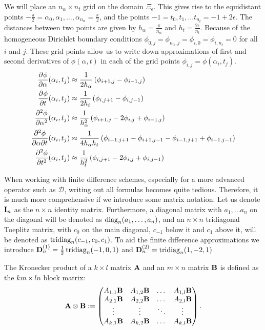 We will place an $n_\alpha \times n_t$ grid on the domain $\Xi_\epsilon$. This gives rise to the equidistant points $-\frac{\pi}{2}=\alpha_0, \alpha_1, \dots, \alpha_{n_\alpha} = \frac{\pi}{2}$, and the points $-1 = t_0, t_1, \dots t_{n_t} = -1 + 2\epsilon$. The distances between two points are given by $h_\alpha = \frac{\pi}{n_\alpha}$ and $h_t = \frac{2\epsilon}{n_t}$. Because of the homogeneous Dirichlet boundary conditions $\phi_{0,j} = \phi_{n_\alpha,j} = \phi_{i, 0} = \phi_{i,n_t} = 0$ for all $i$ and $j$. These grid points allow us to write down approximations of first and second derivatives of $\phi(\alpha, t)$ in each of the grid points $\phi_{i, j} = \phi(\alpha_i, t_j)$.
\begin{align*}
  {\pdv[]{\phi}{\alpha}}(\alpha_i, t_j)    & \approx \frac{1}{2h_\alpha}\left( \phi_{i+1,j} - \phi_{i-1,j} \right)                                           \\
  {\pdv[]{\phi}{t}}(\alpha_i, t_j)         & \approx \frac{1}{2h_t}\left( \phi_{i,j+1} - \phi_{i,j-1} \right)                                                \\
  {\pdv[2]{\phi}{\alpha}}(\alpha_i, t_j)   & \approx \frac{1}{h_\alpha^2}\left( \phi_{i+1,j} - 2 \phi_{i,j} + \phi_{i-1,j} \right)                           \\
  {\pdv[]{\phi}{\alpha}{t}}(\alpha_i, t_j) & \approx \frac{1}{4h_\alpha h_t}\left( \phi_{i+1,j+1} - \phi_{i+1,j-1} - \phi_{i-1,j+1} + \phi_{i-1,j-1} \right) \\
  {\pdv[2]{\phi}{t}}(\alpha_i, t_j)        & \approx \frac{1}{h_t^2}\left( \phi_{i,j+1} - 2 \phi_{i,j} + \phi_{i,j-1} \right)
\end{align*}

When working with finite difference schemes, especially for a more  advanced operator such as $\mathcal{D}$, writing out all formulas becomes quite tedious. Therefore, it is much more comprehensive if we introduce some matrix notation. Let us denote $\vb{I}_n$ as the $n \times n$ identity matrix. Furthermore, a diagonal matrix with $a_1, \dots a_n$ on the diagonal will be denoted as $\operatorname{diag}_n(a_1, \dots, a_n)$, and an $n \times n$ tridiagonal Toeplitz matrix, with $c_{0}$ on the main diagonal, $c_{-1}$ below it and $c_1$ above it, will be denoted as $\operatorname{tridiag}_{n}(c_{-1}, c_{0}, c_1)$. To aid the finite difference approximations we introduce $\vb{D}^{(1)}_n = \frac{1}{2}\operatorname{tridiag}_n(-1,0,1)$ and $\vb{D}^{(2)}_n = \operatorname{tridiag}_n(1,-2,1)$

The Kronecker product of a $k \times l$ matrix $\vb{A}$ and an $m \times n$ matrix $\vb{B}$ is defined as the $km \times ln$ block matrix:
$$
  \vb{A} \otimes \vb{B} := \begin{pmatrix}
    A_{1,1} \vb{B} & A_{1, 2} \vb{B} & \dots  & A_{1, l} \vb{B} \\
    A_{2,1} \vb{B} & A_{2, 2} \vb{B} & \dots  & A_{2, l} \vb{B} \\
    \vdots         & \vdots          & \ddots & \vdots          \\
    A_{k,1} \vb{B} & A_{k, 2} \vb{B} & \dots  & A_{k, l} \vb{B}
  \end{pmatrix}{}\text{.}
$$

